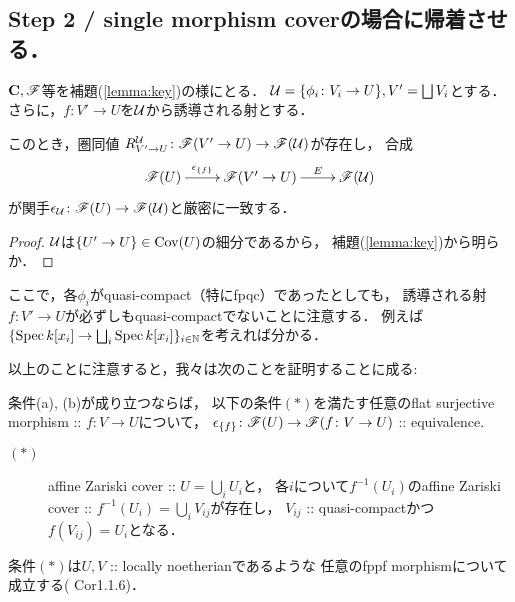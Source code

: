 \documentclass[a4paper]{jsarticle}
\begin{document}

\subsection{Step 2 / single morphism coverの場合に帰着させる．}
    \begin{Cor}
        $\mathbf{C}, \mathscr{F}$等を補題(\ref{lemma:key})の様にとる．
        $\mathcal{U}=\{\phi_i \colon V_i \to U\}, V'=\bigsqcup V_i$とする．
        さらに，$f \colon V' \to U$を$\mathcal{U}$から誘導される射とする．

        このとき，圏同値 $R_{V' \to U}^{\mathcal{U}} \colon \mathscr{F}(V' \to U) \to \mathscr{F}(\mathcal{U})$が存在し，
        合成
        \[\xymatrix{
            \fibF(U) \ar[r]^-{\epsilon_{\{f\}}}& \fibF(V' \to U) \ar[r]^-{E}& \fibF(\covU)
        }\]
        が関手$\epsilon_{\mathcal{U}} \colon \mathscr{F}(U) \to \mathscr{F}(\mathcal{U})$と厳密に一致する．
    \end{Cor}
    \begin{proof}
        $\mathcal{U}$は$\{U' \to U\} \in \operatorname{Cov}(U)$の細分であるから，
        補題(\ref{lemma:key})から明らか．
    \end{proof}

    \begin{Remark}
        ここで，各$\phi_i$がquasi-compact（特にfpqc）であったとしても，
        誘導される射$f \colon V' \to U$が必ずしもquasi-compactでないことに注意する．
        例えば$\{\operatorname{Spec} k[x_i] \to \bigsqcup_i \operatorname{Spec} k[x_i]\}_{i \in \mathbb{N}}$を考えれば分かる．

        以上のことに注意すると，我々は次のことを証明することに成る:
        \begin{Claim}
            条件(a), (b)が成り立つならば，
            以下の条件$(*)$を満たす任意のflat surjective morphism :: $f \colon V \to U$について，
            $\epsilon_{\{f\}} \colon \mathscr{F}(U) \to \mathscr{F}(f \colon V \to U)$ :: equivalence.
            \begin{description}
                \item[$(*)$]
                    affine Zariski cover :: $U=\bigcup_i U_i$と，
                    各$i$について$f^{-1}(U_i)$のaffine Zariski cover :: $f^{-1}(U_i)=\bigcup_i V_{ij}$が存在し，
                    $V_{ij}$ :: quasi-compactかつ$f(V_{ij})=U_i$となる．
            \end{description}
        \end{Claim}
        条件$(*)$は$U, V$ :: locally noetherianであるような
        任意のfppf morphismについて成立する(\cite{ASS} Cor1.1.6)．
    \end{Remark}
\end{document}
